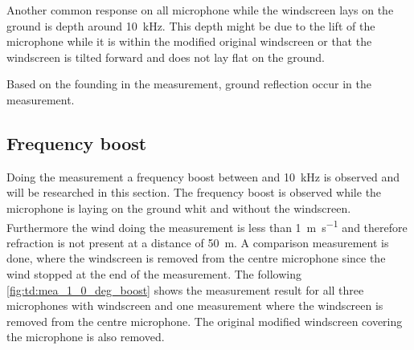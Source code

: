 Another common response on all microphone while the windscreen lays on the ground is depth around \SI{10}{\kilo\hertz}. This depth might be due to the lift of the microphone while it is within the modified original windscreen or that the windscreen is tilted forward and does not lay flat on the ground. 

Based on the founding in the measurement, ground reflection occur in the measurement.


\subsection{Frequency boost}\label{sec:des:freq_boost}
Doing the measurement a frequency boost between  and \SI{10}{\kilo\hertz} is observed and will be researched in this section. The frequency boost is observed while the microphone is laying on the ground whit and without the windscreen. Furthermore the wind doing the measurement is less than \SI{1}{\meter\per\second} and therefore refraction is not present at a distance of \SI{50}{\meter}. A comparison measurement is done, where the windscreen is removed from the centre microphone since the wind stopped at the end of the measurement. The following \autoref{fig:td:mea_1_0_deg_boost} shows the measurement result for all three microphones with windscreen and one measurement where the windscreen is removed from the centre microphone. The original modified windscreen covering the microphone is also removed. 


